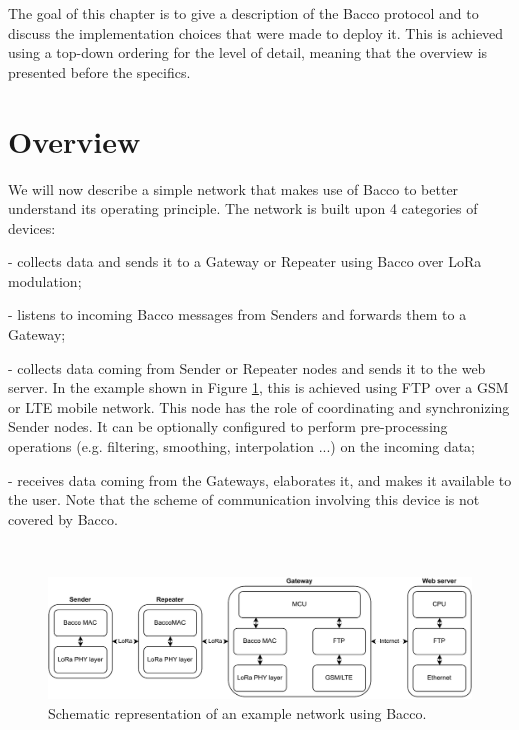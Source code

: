 The goal of this chapter is to give a description of the Bacco protocol and to discuss the
implementation choices that were made to deploy it. This is achieved using a top-down ordering for the level
of detail, meaning that the overview is presented before the specifics.

\section{Overview}
We will now describe a simple network that makes use of Bacco to better understand its operating principle. The
network is built upon 4 categories of devices:

\begin{description}[font=$\bullet$~\normalfont\scshape\color{blue!50!black}]
    \item [Sender node] - collects data and sends it to a Gateway or Repeater using Bacco over LoRa modulation;
    \item [Repeater node] - listens to incoming Bacco messages from Senders and forwards them to a Gateway;
    \item [Gateway node] - collects data coming from Sender or Repeater nodes and sends it to the web server. In the example
        shown in Figure \ref{img: network stack}, this is achieved using \gls{FTP} over a \gls{GSM} or \gls{LTE} mobile
        network. This node has the role of coordinating and synchronizing Sender nodes. It can be optionally configured
        to perform pre-processing operations (e.g. filtering, smoothing, interpolation ...) on the incoming data;
    \item [Web server] - receives data coming from the Gateways, elaborates it, and makes it available to the user. Note
        that the scheme of communication involving this device is not covered by Bacco.
\end{description}
\\
\begin{figure}[ht]
    \centering
    \includegraphics[width=1.0\textwidth]{uml/network_stack.pdf}
    \caption{Schematic representation of an example network using Bacco.}
    \label{img: network stack}
\end{figure}

